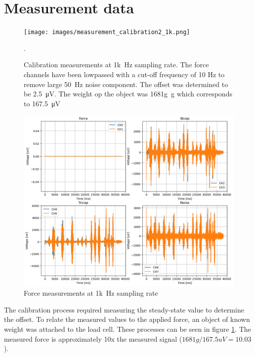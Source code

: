 \section{Measurement data}

\begin{figure}[h!t]
	\begin{center}
		\texttt{[image: images/measurement\_calibration2\_1k.png]}
	\end{center}
	\caption{Calibration measurements at \SI{1k}{\hertz} sampling rate. The force channels have been lowpassed with a cut-off frequency of 10 Hz to remove large \SI{50}{\hertz} noise component. The offset was determined to be \SI{2.5}{\micro\volt}. The weight op the object was \SI{1681g}{\gram} which corresponds to \SI{167.5}{\micro\volt}}.
	\label{fig:calibration_1k}
\end{figure}

\begin{figure}[h!t]
	\begin{center}
		\includegraphics[width=1.0\columnwidth]{images/measurement_meting2_1k.png}
	\end{center}
	\caption{Force measurements at \SI{1k}{\hertz} sampling rate}
	\label{fig:measurement_1k}
\end{figure}

The calibration process required measuring the steady-state value to determine the offset. To relate the measured values to the applied force, an object of known weight was attached to the load cell. These processes can be seen in figure \ref{fig:calibration_1k}. The measured force is approximately 10x the measured signal ($1681g / 167.5 uV = 10.03$).

